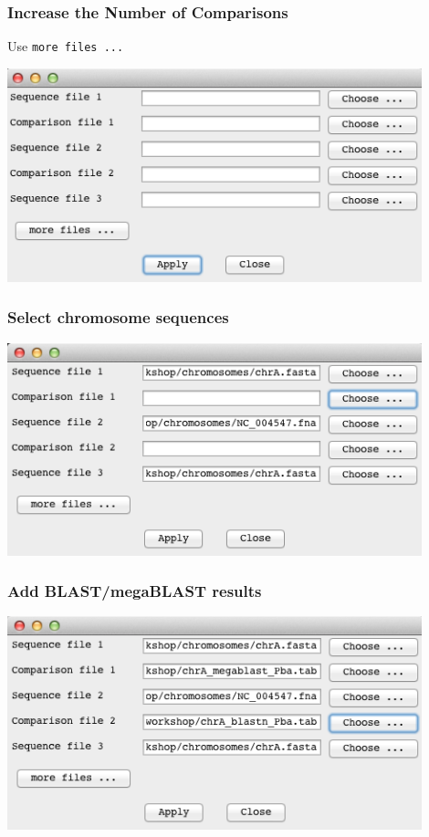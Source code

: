 \begin{frame}
  \frametitle{Increase the Number of Comparisons}
  Use \texttt{more files ...}
  \begin{center}
    \includegraphics[width=0.9\textwidth]{images/act_wgs3}
  \end{center}
\end{frame}

\begin{frame}
  \frametitle{Select chromosome sequences}
  \begin{center}
    \includegraphics[width=0.9\textwidth]{images/act_wgs4}
  \end{center}
\end{frame}

\begin{frame}
  \frametitle{Add BLAST/megaBLAST results}
  \begin{center}
    \includegraphics[width=0.9\textwidth]{images/act_wgs5}
  \end{center}
\end{frame}

